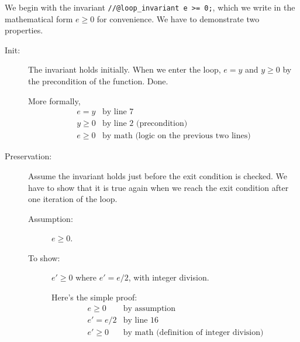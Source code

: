 We begin with the invariant \lstinline'//@loop_invariant e >= 0;',
which we write in the mathematical form $e \geq 0$ for convenience.
We have to demonstrate two properties.
\begin{description}
\item[Init:]%
  The invariant holds initially.  When we enter the loop,
  $e = y$ and $y \geq 0$ by the precondition of the function.  Done.

  More formally,
  $$
  \begin{array}{ll}
     e = y   & \mbox{by line 7}
  \\ y \ge 0 & \mbox{by line 2 (precondition)}
  \\ e \ge 0 & \mbox{by math (logic on the previous two lines)}
  \end{array}
  $$
\item[Preservation:]%
  Assume the invariant holds just before the
  exit condition is checked.  We have to show that it is true
  again when we reach the exit condition after one iteration of
  the loop.
  \begin{description}
  \item[Assumption:] $e \geq 0$.
  \item[To show:] $e' \geq 0$ where $e' = e/2$, with integer
    division.

    Here's the simple proof:
    $$
    \begin{array}{ll}
       e \ge 0  & \mbox{by assumption}
    \\ e' = e/2 & \mbox{by line 16}
    \\ e' \ge 0 & \mbox{by math (definition of integer division)}
    \end{array}
    $$
  \end{description}
\end{description}

